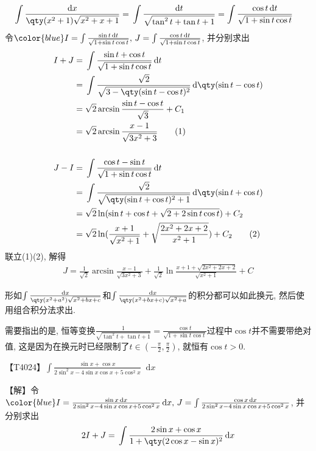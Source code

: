 \documentclass{ctexbook}
\newcommand*{\dif}{\mathop{}\!\mathrm{d}}
\begin{document}
{\begin{align*}
\int\frac{\dif{x}}{\qty(x^{2}+1)\sqrt{x^{2}+x+1}}={}&\int\frac{\dif{t}}{\sqrt{\tan^{2}{t}+\tan{t}+1}}=\int\frac{\cos{t}\dif{t}}{\sqrt{1+\sin{t}\cos{t}}}
\end{align*}
令$\color{blue}I=\int\frac{\sin{t}\dif{t}}{\sqrt{1+\sin{t}\cos{t}}},\,J=\int\frac{\cos{t}\dif{t}}{\sqrt{1+\sin{t}\cos{t}}}$, 并分别求出
\begin{align*}
I+J={}&\int\frac{\sin{t}+\cos{t}}{\sqrt{1+\sin{t}\cos{t}}}\dif{t}\\
={}&\int\frac{\sqrt{2}}{\sqrt{3-\qty(\sin{t}-\cos{t})^{2}}}\dif{\qty(\sin{t}-\cos{t})}\\
={}&\sqrt{2}\arcsin{\frac{\sin{t}-\cos{t}}{\sqrt{3}}}+C_{1}\\
={}&\sqrt{2}\arcsin{\frac{x-1}{\sqrt{3x^{2}+3}}}\tag{1}\\
\\
J-I={}&\int\frac{\cos{t}-\sin{t}}{\sqrt{1+\sin{t}\cos{t}}}\dif{t}\\
={}&\int\frac{\sqrt{2}}{\sqrt{\qty(\sin{t}+\cos{t})^{2}+1}}\dif{\qty(\sin{t}+\cos{t})}\\
={}&\sqrt{2}\ln(\sin{t}+\cos{t}+\sqrt{2+2\sin{t}\cos{t}})+C_{2}\\
={}&\sqrt{2}\ln(\frac{x+1}{\sqrt{x^{2}+1}}+\sqrt{\frac{2x^{2}+2x+2}{x^{2}+1}})+C_{2}\tag{2}
\end{align*}
联立(1)(2), 解得
\begin{align*}
J=\frac{1}{\sqrt{2}}\arcsin{\frac{x-1}{\sqrt{3x^{2}+3}}}+\frac{1}{\sqrt{2}}\ln\frac{x+1+\sqrt{2x^{2}+2x+2}}{\sqrt{x^{2}+1}}+C
\end{align*}\par
{\kaishu 形如$\int\frac{\dif{x}}{\qty(x^{2}+a^{2})\sqrt{x^{2}+bx+c}}$和$\int\frac{\dif{x}}{\qty(x^{2}+bx+c)\sqrt{x^{2}+a}}$的积分都可以如此换元, 然后使用组合积分法求出. \par
需要指出的是, 恒等变换$\frac{1}{\sqrt{\tan^{2}{t}+\tan{t}+1}}=\frac{\cos{t}}{\sqrt{1+\sin{t}\cos{t}}}$过程中$\cos{t}$并不需要带绝对值, 这是因为在换元时已经限制了$t\in\left(-\frac{\pi}{2},\frac{\pi}{2}\right)$, 就恒有$\cos{t}>0$. \par}
【T4024】$\int\frac{\sin{x}+\cos{x}}{2\sin^{2}{x}-4\sin{x}\cos{x}+5\cos^{2}{x}}\dif{x}$\par
【解】令$\color{blue}I=\frac{\sin{x}\dif{x}}{2\sin^{2}{x}-4\sin{x}\cos{x}+5\cos^{2}{x}}\dif{x},\,J=\int\frac{\cos{x}\dif{x}}{2\sin^{2}{x}-4\sin{x}\cos{x}+5\cos^{2}{x}}$, 并分别求出
\begin{align*}
2I+J={}&\int\frac{2\sin{x}+\cos{x}}{1+\qty(2\cos{x}-\sin{x})^{2}}\dif{x}\\

\end{align*}}
\end{document}
